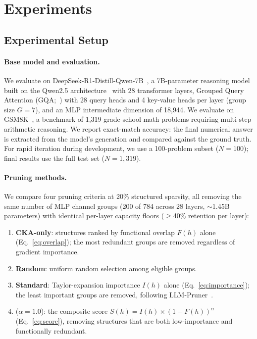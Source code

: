 
\section{Experiments}
\label{sec:experiments}

\subsection{Experimental Setup}
\label{sec:exp_setup}

\paragraph{Base model and evaluation.}
We evaluate on DeepSeek-R1-Distill-Qwen-7B~\citep{deepseek2025r1}, a 7B-parameter reasoning model built on the Qwen2.5 architecture~\citep{qwen2.5} with 28 transformer layers, Grouped Query Attention (GQA;~\citealp{ainslie2023gqa}) with 28 query heads and 4 key-value heads per layer (group size $G{=}7$), and an MLP intermediate dimension of 18{,}944.
We evaluate on GSM8K~\citep{cobbe2021gsm8k}, a benchmark of 1{,}319 grade-school math problems requiring multi-step arithmetic reasoning.
We report exact-match accuracy: the final numerical answer is extracted from the model's generation and compared against the ground truth.
For rapid iteration during development, we use a 100-problem subset ($N{=}100$); final results use the full test set ($N{=}1{,}319$).

\paragraph{Pruning methods.}
We compare four pruning criteria at 20\% structured sparsity, all removing the same number of MLP channel groups (200 of 784 across 28 layers, ${\sim}$1.45B parameters) with identical per-layer capacity floors (${\ge}$40\% retention per layer):
\begin{enumerate}[nosep,leftmargin=*]
    \item \textbf{CKA-only}: structures ranked by functional overlap $F(h)$ alone (Eq.~\ref{eq:overlap}); the most redundant groups are removed regardless of gradient importance.
    \item \textbf{Random}: uniform random selection among eligible groups.
    \item \textbf{Standard}: Taylor-expansion importance $I(h)$ alone (Eq.~\ref{eq:importance}); the least important groups are removed, following LLM-Pruner~\citep{llmpruner2023}.
    \item \textbf{\rasp{}} ($\alpha{=}1.0$): the composite score $S(h) = I(h) \times (1 - F(h))^\alpha$ (Eq.~\ref{eq:score}), removing structures that are both low-importance and functionally redundant.
\end{enumerate}

